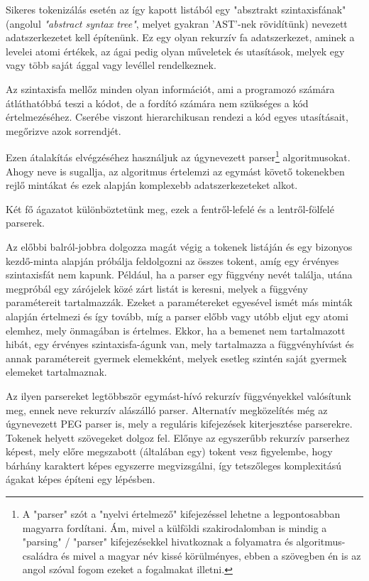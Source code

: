 Sikeres tokenizálás esetén az így kapott listából egy "absztrakt szintaxisfának" (angolul \textit{"abstract syntax tree"}, melyet gyakran 'AST'-nek rövidítünk) nevezett adatszerkezetet kell építenünk. Ez egy olyan rekurzív fa adatszerkezet, aminek a levelei atomi értékek, az ágai pedig olyan műveletek és utasítások, melyek egy vagy több saját ággal vagy levéllel rendelkeznek.

Az szintaxisfa mellőz minden olyan információt, ami a programozó számára átláthatóbbá teszi a kódot, de a fordító számára nem szükséges a kód értelmezéséhez. Cserébe viszont hierarchikusan rendezi a kód egyes utasításait, megőrizve azok sorrendjét.

Ezen átalakítás elvégzéséhez használjuk az úgynevezett parser\footnote{A "parser" szót a "nyelvi értelmező" kifejezéssel lehetne a legpontosabban magyarra fordítani. Ám, mivel a külföldi szakirodalomban is mindig a "parsing" / "parser" kifejezésekkel hivatkoznak a folyamatra és algoritmus-családra és mivel a magyar név kissé körülményes, ebben a szövegben én is az angol szóval fogom ezeket a fogalmakat illetni.} algoritmusokat. Ahogy neve is sugallja, az algoritmus értelemzi az egymást követő tokenekben rejlő mintákat és ezek alapján komplexebb adatszerkezeteket alkot.

Két fő ágazatot különböztetünk meg, ezek a fentről-lefelé és a lentről-fölfelé parserek.

Az előbbi balról-jobbra dolgozza magát végig a tokenek listáján és egy bizonyos kezdő-minta alapján próbálja feldolgozni az összes tokent, amíg egy érvényes szintaxisfát nem kapunk. Például, ha a parser egy függvény nevét találja, utána megpróbál egy zárójelek közé zárt listát is keresni, melyek a függvény paramétereit tartalmazzák. Ezeket a paramétereket egyesével ismét más minták alapján értelmezi és így tovább, míg a parser előbb vagy utóbb eljut egy atomi elemhez, mely önmagában is értelmes. Ekkor, ha a bemenet nem tartalmazott hibát, egy érvényes szintaxisfa-águnk van, mely tartalmazza a függvényhívást és annak paramétereit gyermek elemekként, melyek esetleg szintén saját gyermek elemeket tartalmaznak. 

Az ilyen parsereket legtöbbször egymást-hívó rekurzív függvényekkel valósítunk meg, ennek neve rekurzív alászálló parser. Alternatív megközelítés még az úgynevezett PEG parser is, mely a reguláris kifejezések kiterjesztése parserekre. Tokenek helyett szövegeket dolgoz fel. Előnye az egyszerűbb rekurzív parserhez képest, mely előre megszabott (általában egy) tokent vesz figyelembe, hogy bárhány karaktert képes egyszerre megvizsgálni, így tetszőleges komplexitású ágakat képes építeni egy lépésben.

